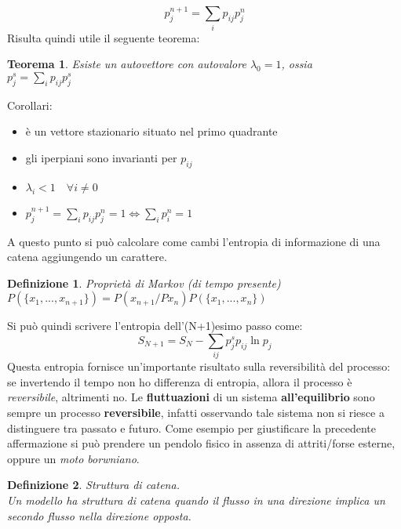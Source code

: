 \documentclass[12pt, a4paper]{article}
\theoremstyle{theorem}
\newtheorem{definition}{Definizione}[section]
\newtheorem{theorem}{Teorema}[section]
\begin{document}
		\begin{equation}
			p_j^{n+1}=\sum_ip_{ij}p_j^n
		\end{equation}
		Risulta quindi utile il seguente teorema:
		\begin{theorem}
			Esiste un autovettore con autovalore $\lambda_0=1$, ossia\\
			$p_j^s=\sum_ip_{ij}p_j^s$
		\end{theorem}
		Corollari:
		\begin{itemize}
			\item è un vettore stazionario situato nel primo quadrante
			\item gli iperpiani sono invarianti per $p_{ij}$
			\item $\lambda_i<1\quad\forall i\neq 0$
			\item $p_j^{n+1}=\sum_ip_{ij}p_j^n=1\Leftrightarrow\sum_ip_i^n=1$
		\end{itemize}
		A questo punto si può calcolare come cambi l'entropia di informazione di una catena aggiungendo un carattere.
		\begin{definition}
			Proprietà di Markov (di tempo presente)\\
			$P(\{x_1,...,x_{n+1}\})=P(x_{n+1}/Px_n)P(\{x_1,...,x_{n}\})$
		\end{definition}
		Si può quindi scrivere l'entropia dell'(N+1)esimo passo come:
		\begin{equation}
			S_{N+1}=S_N-\sum_{ij}p_j^sp_{ij}\ln p_j
		\end{equation}
		Questa entropia fornisce un'importante risultato sulla reversibilità del processo:
		se invertendo il tempo non ho differenza di entropia, allora il processo è \textit{reversibile}, altrimenti no.
		Le \textbf{fluttuazioni} di un sistema \textbf{all'equilibrio} sono sempre un processo \textbf{reversibile}, infatti osservando tale sistema non si riesce a distinguere tra passato e futuro.
		Come esempio per giustificare la precedente affermazione si può prendere un pendolo fisico in assenza di attriti/forse esterne, oppure un \textit{moto borwniano}.
		\begin{definition}
			Struttura di catena.\\
			Un modello ha struttura di catena quando il flusso in una direzione implica un secondo flusso nella direzione opposta.
		\end{definition}
\end{document}

